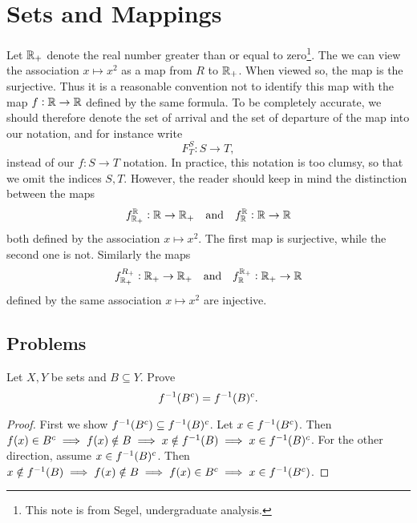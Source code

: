 \chapter{Sets and Mappings}

\begin{remark}
	Let $\mathbb{R}_+$ denote the real number greater than or equal to zero\footnote{This note is from Segel, undergraduate analysis.}. The we can view the association $x \mapsto x^2$ as a map from $R$ to $\mathbb{R}_+$. When viewed so, the map is the surjective. Thus it is a reasonable convention not to identify this map with the map $f:\mathbb{R} \to \mathbb{R}$ defined by the same formula. To be completely accurate, we should therefore denote the set of arrival and the set of departure of the map into our notation, and for instance write
	\[ F^S_T: S \to T, \]
	instead of our $f: S \to T$ notation. In practice, this notation is too clumsy, so that we omit the indices $S, T.$ However, the reader should keep in mind the distinction between the maps 
	\[ f^{\mathbb{R}}_{\mathbb{R}_+}: \mathbb{R} \to \mathbb{R}_+ \quad \text{and} \quad f_{\mathbb{R}}^{\mathbb{R}}: \mathbb{R} \to \mathbb{R}  \]
	both defined by the association $x \mapsto x^2$. The first map is surjective, while the second one is not. Similarly the maps
	\[ f_{\mathbb{R}_+}^{R_+}: \mathbb{R}_+ \to \mathbb{R}_+ \quad \text{and} \quad f_{\mathbb{R}}^{\mathbb{R}_+}: \mathbb{R}_+ \to \mathbb{R} \]
	defined by the same association $x \mapsto x^2$ are injective.
\end{remark}

\begin{remark}

\end{remark}



\section{Problems}
\begin{problem}
	Let $X,Y$ be sets and $B \subseteq Y$. Prove
	\[ f^{-1}(B^c) = f^{-1}(B)^c. \]
\end{problem}

\begin{proof}
	First we show $f^{-1}(B^c) \subseteq f^{-1}(B)^c$. Let $x \in f^{-1}(B^c)$. Then $f(x) \in B^c \implies f(x) \notin B \implies x \notin f^{-1}(B) \implies x \in f^{-1}(B)^c$. For the other direction, assume $x \in f^{-1}(B)^c$. Then $x \notin f^{-1}(B) \implies f(x) \notin B \implies f(x) \in B^c \implies x \in f^{-1}(B^c)$. 
\end{proof}

